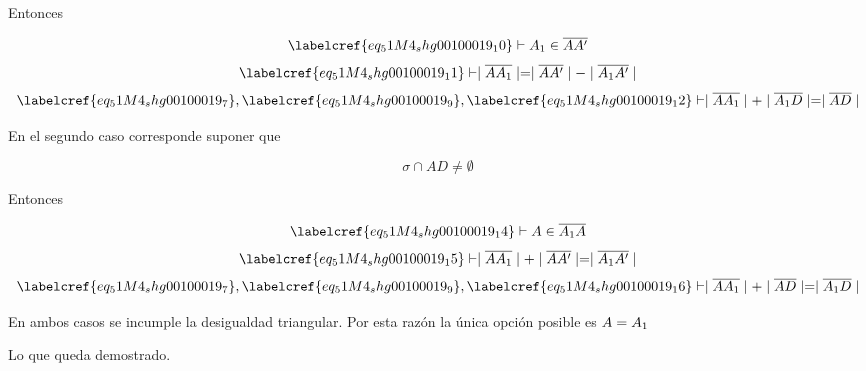 Entonces 

\begin{equation} \label{eq_51M4_shg00100019_11}
	\labelcref{eq_51M4_shg00100019_10} \vdash A\textsubscript{1} \in \overline{AA'}
\end{equation}
\begin{equation} \label{eq_51M4_shg00100019_12}
	\labelcref{eq_51M4_shg00100019_11} \vdash \mid\overline{AA\textsubscript{1}}\mid = \mid\overline{AA'}\mid - \mid\overline{A\textsubscript{1}A'}\mid
\end{equation}
\begin{equation} \label{eq_51M4_shg00100019_13}
	\labelcref{eq_51M4_shg00100019_7}, \labelcref{eq_51M4_shg00100019_9}, \labelcref{eq_51M4_shg00100019_12} \vdash \mid\overline{AA\textsubscript{1}}\mid + \mid\overline{A\textsubscript{1}D}\mid = \mid\overline{AD}\mid
\end{equation}

En el segundo caso corresponde suponer que

\begin{equation} \label{eq_51M4_shg00100019_14}
	\sigma \cap AD \neq \emptyset
\end{equation}

Entonces 

\begin{equation} \label{eq_51M4_shg00100019_15}
	\labelcref{eq_51M4_shg00100019_14} \vdash A \in \overline{A\textsubscript{1}A}
\end{equation}
\begin{equation} \label{eq_51M4_shg00100019_16}
	\labelcref{eq_51M4_shg00100019_15} \vdash \mid\overline{AA\textsubscript{1}}\mid + \mid\overline{AA'}\mid = \mid\overline{A\textsubscript{1}A'}\mid
\end{equation}
\begin{equation} \label{eq_51M4_shg00100019_17}
	\labelcref{eq_51M4_shg00100019_7}, \labelcref{eq_51M4_shg00100019_9}, \labelcref{eq_51M4_shg00100019_16} \vdash \mid\overline{AA\textsubscript{1}}\mid + \mid\overline{AD}\mid = \mid\overline{A\textsubscript{1}D}\mid
\end{equation}

En ambos casos se incumple la desigualdad triangular. Por esta razón la única opción posible es $A = A\textsubscript{1}$

\vspace{1cm}
Lo que queda demostrado. \\\\\\

